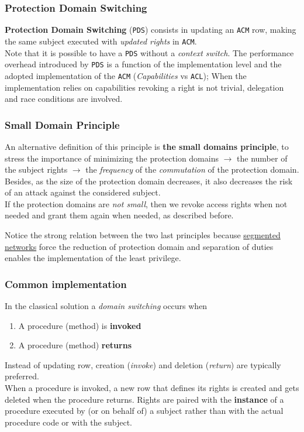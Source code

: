 \subsubsection{Protection Domain Switching}
\textbf{Protection Domain Switching} (\texttt{PDS}) consists in updating an \texttt{ACM} row,
making the same subject executed
with \textit{updated rights} in \texttt{ACM}.\\
Note that it is possible to have a \texttt{PDS} without a \textit{context switch}.
The performance overhead introduced by \texttt{PDS} is a function of the
implementation level and the adopted implementation of the
\texttt{ACM} (\textit{Capabilities} vs \texttt{ACL});
When the implementation relies on capabilities revoking a right is not trivial,
delegation and race conditions are involved.

\subsubsection{Small Domain Principle}
An alternative definition of this principle is \textbf{the small
domains principle}, to stress the importance of minimizing the
protection domains $\longrightarrow$ the number of the subject rights $\longrightarrow$ the
\textit{frequency} of the \textit{commutation} of the protection domain.\\
Besides, as the size of the protection domain decreases, it also
decreases the risk of an attack against the considered
subject.\\
If the protection domains are \textit{not small}, then we revoke access
rights when not needed and grant them again when needed, as described before.

\nl
Notice the strong relation between the two last principles
because \ul{segmented networks} force the reduction of protection
domain and separation of duties enables the implementation of
the least privilege.

\subsubsection{Common implementation}
In the classical solution a \textit{domain switching} occurs when
\begin{enumerate}
   \item A procedure (method) is \textbf{invoked}
   \item A procedure (method) \textbf{returns}
\end{enumerate}

Instead of updating row, creation (\textit{invoke}) and deletion (\textit{return}) are typically preferred.\\
When a procedure is invoked, a new row that defines its
rights is created and gets deleted when the procedure returns.
Rights are paired with the \textbf{instance} of a procedure executed
by (or on behalf of) a subject rather than with the actual procedure
code or with the subject.

